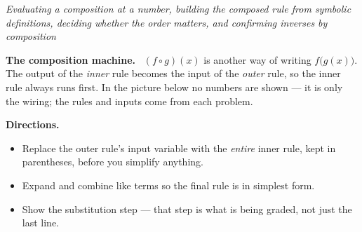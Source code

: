 \documentclass[12pt]{article}
\begin{document}

\begin{center}
\textit{Evaluating a composition at a number, building the composed rule from
symbolic definitions, deciding whether the order matters, and confirming
inverses by composition}
\end{center}

\noindent\textbf{The composition machine.} \ $(f \circ g)(x)$ is another way of
writing $f\big(g(x)\big)$. The output of the \emph{inner} rule becomes the
input of the \emph{outer} rule, so the inner rule always runs first. In the
picture below no numbers are shown --- it is only the wiring; the rules and
inputs come from each problem.

\begin{center}
\end{center}

\noindent\textbf{Directions.}
\begin{itemize}[leftmargin=1.2cm, itemsep=2pt, topsep=2pt]
\item Replace the outer rule's input variable with the \emph{entire} inner
rule, kept in parentheses, before you simplify anything.
\item Expand and combine like terms so the final rule is in simplest form.
\item Show the substitution step --- that step is what is being graded, not
just the last line.
\end{itemize}


\end{document}
